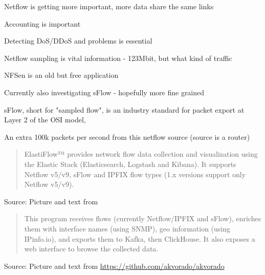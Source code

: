 \documentclass[Screen16to9,17pt]{foils}
\begin{document}
\begin{list2}
\item Netflow is getting more important, more data share the same links
\item Accounting is important
\item Detecting DoS/DDoS and problems is essential
\item Netflow sampling is vital information - 123Mbit, but what kind of traffic
\item NFSen is an old but free application
\item Currently also investigating sFlow - hopefully more fine grained
\item sFlow, short for "sampled flow", is an industry standard for packet export at Layer 2 of the OSI model, \\
\end{list2}









\centerline{An extra 100k packets per second from this netflow source (source is a router)}





\begin{quote}
  ElastiFlow™ provides network flow data collection and visualization using the Elastic Stack (Elasticsearch, Logstash and Kibana). It supports Netflow v5/v9, sFlow and IPFIX flow types (1.x versions support only Netflow v5/v9).
\end{quote}
Source: Picture and text from  \\



\begin{quote}
This program receives flows (currently Netflow/IPFIX and sFlow), enriches them with interface names (using SNMP), geo information (using IPinfo.io), and exports them to Kafka, then ClickHouse. It also exposes a web interface to browse the collected data.
\end{quote}
Source: Picture and text from \url{https://github.com/akvorado/akvorado}
\end{document}
